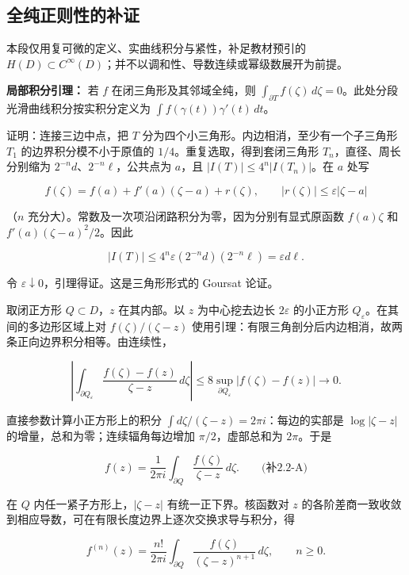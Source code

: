 \documentclass[11pt,a4paper]{article}
\begin{document}
\subsection{全纯正则性的补证}\label{ch02-s2-ux5168ux7eafux6b63ux5219ux6027ux7684ux8865ux8bc1}

本段仅用复可微的定义、实曲线积分与紧性，补足教材预引的
\(H(D)\subset C^\infty(D)\)；并不以调和性、导数连续或幂级数展开为前提。

\textbf{局部积分引理：} 若 \(f\) 在闭三角形及其邻域全纯，则
\(\int_{\partial T}f(\zeta)\,d\zeta=0\)。此处分段光滑曲线积分按实积分定义为
\(\int f(\gamma(t))\gamma'(t)\,dt\)。

证明：连接三边中点，把 \(T\)
分为四个小三角形。内边相消，至少有一个子三角形 \(T_1\)
的边界积分模不小于原值的 \(1/4\)。重复选取，得到套闭三角形
\(T_n\)，直径、周长分别缩为 \(2^{-n}d\)、\(2^{-n}\ell\)，公共点为
\(a\)，且 \(|I(T)|\le4^n|I(T_n)|\)。在 \(a\) 处写

\[
f(\zeta)=f(a)+f'(a)(\zeta-a)+r(\zeta),\qquad
|r(\zeta)|\le\varepsilon|\zeta-a|
\]

（\(n\) 充分大）。常数及一次项沿闭路积分为零，因为分别有显式原函数
\(f(a)\zeta\) 和 \(f'(a)(\zeta-a)^2/2\)。因此

\[
|I(T)|\le4^n\varepsilon(2^{-n}d)(2^{-n}\ell)=\varepsilon d\ell.
\]

令 \(\varepsilon\downarrow0\)，引理得证。这是三角形形式的 Goursat 论证。

取闭正方形 \(Q\subset D\)，\(z\) 在其内部。以 \(z\) 为中心挖去边长
\(2\varepsilon\) 的小正方形 \(Q_\varepsilon\)。在其间的多边形区域上对
\(f(\zeta)/(\zeta-z)\)
使用引理：有限三角剖分后内边相消，故两条正向边界积分相等。由连续性，

\[
\left|\int_{\partial Q_\varepsilon}\frac{f(\zeta)-f(z)}{\zeta-z}\,d\zeta\right|
\le8\sup_{\partial Q_\varepsilon}|f(\zeta)-f(z)|\longrightarrow0.
\]

直接参数计算小正方形上的积分
\(\int d\zeta/(\zeta-z)=2\pi i\)：每边的实部是 \(\log|\zeta-z|\)
的增量，总和为零；连续辐角每边增加 \(\pi/2\)，虚部总和为 \(2\pi\)。于是

\[
f(z)=\frac1{2\pi i}\int_{\partial Q}\frac{f(\zeta)}{\zeta-z}\,d\zeta.
\qquad\text{(补2.2-A)}
\]

在 \(Q\) 内任一紧子方形上，\(|\zeta-z|\) 有统一正下界。核函数对 \(z\)
的各阶差商一致收敛到相应导数，可在有限长度边界上逐次交换求导与积分，得

\[
f^{(n)}(z)=\frac{n!}{2\pi i}\int_{\partial Q}\frac{f(\zeta)}{(\zeta-z)^{n+1}}\,d\zeta,\qquad n\ge0.
\]
\end{document}
